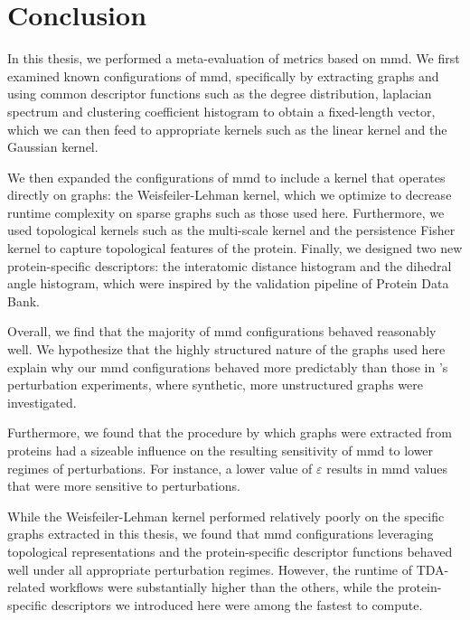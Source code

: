 \chapter{Conclusion}\label{chap:conclusion}

In this thesis, we performed a meta-evaluation of metrics based on \acrshort{mmd}. We first
examined known configurations of \acrshort{mmd}, specifically by extracting graphs and
using common descriptor functions such as the degree distribution, laplacian
spectrum and clustering coefficient histogram to obtain a fixed-length vector,
which we can then feed to appropriate kernels such as the linear kernel and the
Gaussian kernel.

We then expanded the configurations of \acrshort{mmd} to include a kernel that operates
directly on graphs: the Weisfeiler-Lehman kernel, which we optimize to decrease
runtime complexity on sparse graphs such as those used here. Furthermore, we
used topological kernels such as the multi-scale kernel and the persistence
Fisher kernel to capture topological features of the protein. Finally, we
designed two new protein-specific descriptors: the interatomic distance
histogram and the dihedral angle histogram, which were inspired by the
validation pipeline of Protein Data Bank.

Overall, we find that the majority of \acrshort{mmd} configurations behaved reasonably
well. We hypothesize that the highly structured nature of the graphs used here
explain why our \acrshort{mmd} configurations behaved more predictably than those
in \cite{obray2022evaluation}'s perturbation experiments, where synthetic, more
unstructured graphs were investigated.

Furthermore, we found that the procedure by which graphs were extracted from
proteins had a sizeable influence on the resulting sensitivity of \acrshort{mmd} to lower
regimes of perturbations. For instance, a lower value of $\varepsilon$ results
in \acrshort{mmd} values that were more sensitive to perturbations.

While the Weisfeiler-Lehman kernel performed relatively poorly on the specific
graphs extracted in this thesis, we found that \acrshort{mmd} configurations leveraging
topological representations and the protein-specific descriptor functions
behaved well under all appropriate perturbation regimes. However, the runtime of
TDA-related workflows were substantially higher than the others, while the
protein-specific descriptors we introduced here were among the fastest to
compute.


